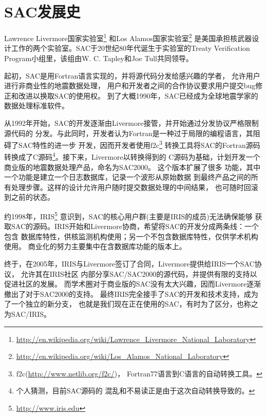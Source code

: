 \section{SAC发展史}
\label{sec:history}

Lawrence Livermore国家实验室\footnote{\url{http://en.wikipedia.org/wiki/Lawrence\_Livermore\_National\_Laboratory}}
和Los Alamos国家实验室\footnote{\url{http://en.wikipedia.org/wiki/Los\_Alamos\_National\_Laboratory}}
是美国承担核武器设计工作的两个实验室。SAC于20世纪80年代诞生于实验室的Treaty Verification Program小组里，该组由W. C. Tapley和Joe Tull共同领导。

起初，SAC是用Fortran语言实现的，并将源代码分发给感兴趣的学者，
允许用户进行非商业性的地震数据处理，
用户和开发者之间的合作协议要求用户提交bug修正和改进以换取SAC的使用权。
到了大概1990年，SAC已经成为全球地震学家的数据处理标准软件。

从1992年开始，SAC的开发逐渐由Livermore接管，并开始通过分发协议严格限制源代码的
分发。与此同时，开发者认为Fortran是一种过于局限的编程语言，其阻碍了SAC特性的进一步
开发，因而开发者使用f2c\footnote{f2c(\url{http://www.netlib.org/f2c/})，
Fortran77语言到C语言的自动转换工具。}
转换工具将SAC的Fortran源码转换成了C源码\footnote{个人猜测，目前SAC源码的
混乱和不易读正是由于这次自动转换导致的。}。接下来，Livermore以转换得到的
C源码为基础，计划开发一个商业版的地震数据处理产品，命名为SAC2000。
这个版本扩展了很多
功能，其中一个功能是建立一个日志数据库，记录一个波形从原始数据
到最终产品之间的所有处理步骤。这样的设计允许用户随时提交数据处理的中间结果，
也可随时回滚到之前的状态。

约1998年，IRIS\footnote{\url{http://www.iris.edu}}
意识到，SAC的核心用户群(主要是IRIS的成员)无法确保能够
获取SAC的源码。IRIS开始和Livermore协商，希望将SAC的开发分成两条线：一个包含
数据库特性，供核监测机构使用；另一个不包含数据库特性，仅供学术机构使用。
商业化的努力主要集中在含数据库功能的版本上。

终于，在2005年，IRIS与Livermore签订了合同，Livermore提供给IRIS一个SAC协议，
允许其在IRIS社区
内部分享SAC/SAC2000的源代码，并提供有限的支持以促进社区的发展。
而学术圈对于商业版的SAC没有太大兴趣，因而Livermore逐渐撤出了对于SAC2000的支持。
最终IRIS完全接手了SAC的开发和技术支持，成为了一个独立的新分支，
也就是我们现在正在使用的SAC，有时为了区分，也称之为SAC/IRIS。
